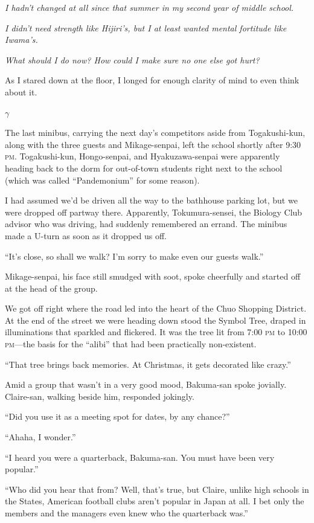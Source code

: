 \documentclass[
    a4paper,
    12pt,
    twoside,
    openany,
    UTF8,
    fontset=windows
]{ctexbook}
\begin{document}
\textit{I hadn't changed at all since that summer in my second year of middle school.}

\textit{I didn't need strength like Hijiri's, but I at least wanted mental fortitude like Iwama's.}

\textit{What should I do now? How could I make sure no one else got hurt?}

As I stared down at the floor, I longed for enough clarity of mind to even think about it.

$\gamma$

The last minibus, carrying the next day's competitors aside from Togakushi-kun, along with the three guests and Mikage-senpai, left the school shortly after 9:30 \textsc{pm}. Togakushi-kun, Hongo-senpai, and Hyakuzawa-senpai were apparently heading back to the dorm for out-of-town students right next to the school (which was called ``Pandemonium'' for some reason).

I had assumed we'd be driven all the way to the bathhouse parking lot, but we were dropped off partway there. Apparently, Tokumura-sensei, the Biology Club advisor who was driving, had suddenly remembered an errand. The minibus made a U-turn as soon as it dropped us off.

``It's close, so shall we walk? I'm sorry to make even our guests walk.''

Mikage-senpai, his face still smudged with soot, spoke cheerfully and started off at the head of the group.

We got off right where the road led into the heart of the Chuo Shopping District. At the end of the street we were heading down stood the Symbol Tree, draped in illuminations that sparkled and flickered. It was the tree lit from 7:00 \textsc{pm} to 10:00 \textsc{pm}---the basis for the ``alibi'' that had been practically non-existent.

``That tree brings back memories. At Christmas, it gets decorated like crazy.''

Amid a group that wasn't in a very good mood, Bakuma-san spoke jovially. Claire-san, walking beside him, responded jokingly.

``Did you use it as a meeting spot for dates, by any chance?''

``Ahaha, I wonder.''

``I heard you were a quarterback, Bakuma-san. You must have been very popular.''

``Who did you hear that from? Well, that's true, but Claire, unlike high schools in the States, American football clubs aren't popular in Japan at all. I bet only the members and the managers even knew who the quarterback was.''
\end{document}
